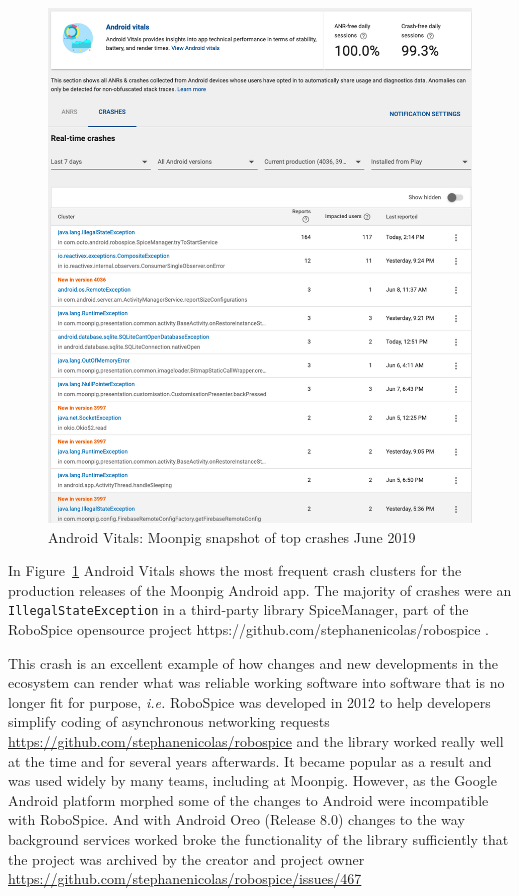 \begin{figure}
    \centering
    \includegraphics[width=13cm]{images/android-vitals-screenshots/moonpig/real-time-crashes-Screenshot-2019-06-10-at-15.42.34.png}
    \caption{Android Vitals: Moonpig snapshot of top crashes  June 2019}
    \label{fig:av-moonpig-top-real-time-crashes-10-jun-2019}
\end{figure}

In Figure~\ref{fig:av-moonpig-top-real-time-crashes-10-jun-2019} Android Vitals shows the most frequent crash clusters for the production releases of the Moonpig Android app. The majority of crashes were an \texttt{IllegalStateException} in a third-party library SpiceManager, part of the RoboSpice opensource project https://github.com/stephanenicolas/robospice . 

This crash is an excellent example of how changes and new developments in the ecosystem can render what was reliable working software into software that is no longer fit for purpose, \emph{i.e.} RoboSpice was developed in 2012 to help developers simplify coding of asynchronous networking requests \url{https://github.com/stephanenicolas/robospice} and the library worked really well at the time and for several years afterwards. It became popular as a result and was used widely by many teams, including at Moonpig. However, as the Google Android platform morphed some of the changes to Android were incompatible with RoboSpice. And with Android Oreo (Release 8.0) changes to the way background services worked broke the functionality of the library sufficiently that the project was archived by the creator and project owner \url{https://github.com/stephanenicolas/robospice/issues/467} 

